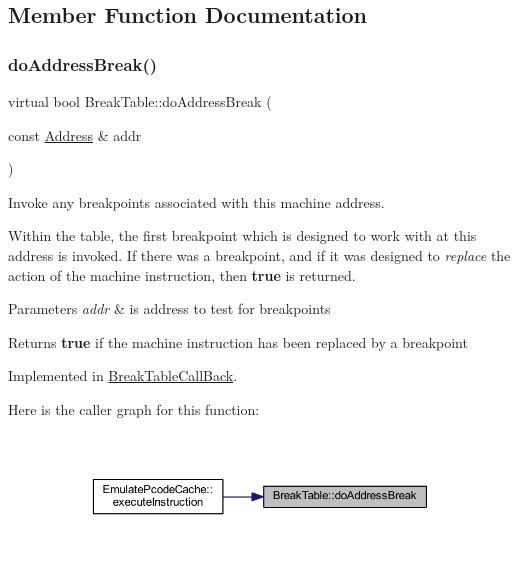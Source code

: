\subsection{Member Function Documentation}
\mbox{\label{class_break_table_a7833a73318fadd483f73fbd33bdffd23}} 
\subsubsection{\texorpdfstring{doAddressBreak()}{doAddressBreak()}}
{\footnotesize\ttfamily virtual bool Break\+Table\+::do\+Address\+Break (\begin{DoxyParamCaption}\item[{const \mbox{\hyperlink{class_address}{Address}} \&}]{addr }\end{DoxyParamCaption})\hspace{0.3cm}{\ttfamily [pure virtual]}}



Invoke any breakpoints associated with this machine address. 

Within the table, the first breakpoint which is designed to work with at this address is invoked. If there was a breakpoint, and if it was designed to {\itshape replace} the action of the machine instruction, then {\bfseries{true}} is returned. 
\begin{DoxyParams}{Parameters}
{\em addr} & is address to test for breakpoints \\
\hline
\end{DoxyParams}
\begin{DoxyReturn}{Returns}
{\bfseries{true}} if the machine instruction has been replaced by a breakpoint 
\end{DoxyReturn}


Implemented in \mbox{\hyperlink{class_break_table_call_back_af2d28bc35a414feed38205b41f387afc}{Break\+Table\+Call\+Back}}.

Here is the caller graph for this function\+:
\nopagebreak
\begin{figure}[H]
\begin{center}
\leavevmode
\includegraphics[width=350pt]{class_break_table_a7833a73318fadd483f73fbd33bdffd23_icgraph}
\end{center}
\end{figure}
\mbox{\label{class_break_table_af8829327f29c768f834825fe40b54bad}} 
